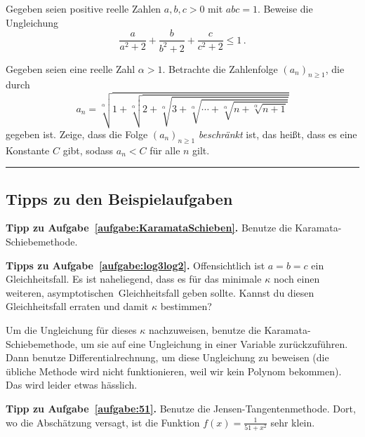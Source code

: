 \begin{aufgabe*}\label{aufgabe:MatBoj2015}
	Gegeben seien positive reelle Zahlen $a,b,c>0$ mit $abc=1$. Beweise die Ungleichung
	\begin{equation*}
		\frac{a}{a^2+2}+\frac{b}{b^2+2}+\frac{c}{c^2+2}\leqslant 1\,.
	\end{equation*}
\end{aufgabe*}

\begin{aufgabe*}\label{aufgabe:DEMO2013}
	Gegeben seien eine reelle Zahl $\alpha>1$. Betrachte die Zahlenfolge $(a_n)_{n\geqslant 1}$, die durch
	\begin{equation*}
		a_n=\sqrt[\alpha]{1+\sqrt[\alpha]{2+\sqrt[\alpha]{3+\sqrt[\alpha]{\dotsb+\sqrt[\alpha]{n+\sqrt[\alpha]{n+1}}}}}}
	\end{equation*}
	gegeben ist. Zeige, dass die Folge $(a_n)_{n\geqslant 1}$ \emph{beschränkt} ist, das heißt, dass es eine Konstante $C$ gibt, sodass $a_n<C$ für alle $n$ gilt.
\end{aufgabe*}

\vfill\hrule\vspace{-1em}

\subsection*{Tipps zu den Beispielaufgaben}
\textbf{Tipp zu Aufgabe~\ref{aufgabe:KaramataSchieben}.} Benutze die Karamata-Schiebemethode.%

\textbf{Tipps zu Aufgabe~\ref{aufgabe:log3log2}.} Offensichtlich ist $a=b=c$ ein Gleichheitsfall. Es ist naheliegend, dass es für das minimale $\kappa$ noch einen weiteren, \glqq asymptotischen\grqq\ Gleichheitsfall geben sollte. Kannst du diesen Gleichheitsfall erraten und damit $\kappa$ bestimmen?

Um die Ungleichung für dieses $\kappa$ nachzuweisen, benutze die Karamata-Schiebemethode, um sie auf eine Ungleichung in einer Variable zurückzuführen. Dann benutze Differentialrechnung, um diese Ungleichung zu beweisen (die übliche Methode wird nicht funktionieren, weil wir kein Polynom bekommen). Das wird leider etwas hässlich.

\textbf{Tipp zu Aufgabe~\ref{aufgabe:51}.} Benutze die Jensen-Tangentenmethode. Dort, wo die Abschätzung versagt, ist die Funktion $f(x)=\frac1{51+x^2}$ sehr klein.

